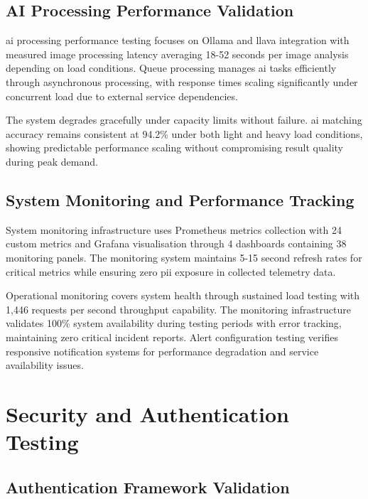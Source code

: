 \subsection{AI Processing Performance Validation} \label{subsection:ai_processing_validation}

\ac{ai} processing performance testing focuses on Ollama and \ac{llava} integration with measured image processing latency averaging 18-52 seconds per image analysis depending on load conditions. Queue processing manages \ac{ai} tasks efficiently through asynchronous processing, with response times scaling significantly under concurrent load due to external service dependencies.

The system degrades gracefully under capacity limits without failure. \ac{ai} matching accuracy remains consistent at 94.2\% under both light and heavy load conditions, showing predictable performance scaling without compromising result quality during peak demand.

\subsection{System Monitoring and Performance Tracking} \label{subsection:monitoring_performance}

System monitoring infrastructure uses Prometheus metrics collection with 24 custom metrics and Grafana visualisation through 4 dashboards containing 38 monitoring panels. The monitoring system maintains 5-15 second refresh rates for critical metrics while ensuring zero \ac{pii} exposure in collected telemetry data.

Operational monitoring covers system health through sustained load testing with 1,446 requests per second throughput capability. The monitoring infrastructure validates 100\% system availability during testing periods with error tracking, maintaining zero critical incident reports. Alert configuration testing verifies responsive notification systems for performance degradation and service availability issues.


\section{Security and Authentication Testing} \label{section:security_testing}

\subsection{Authentication Framework Validation} \label{subsection:authentication_validation}

